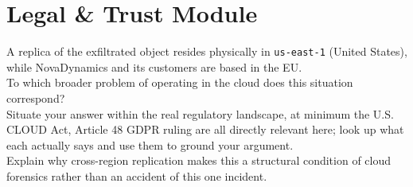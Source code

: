 \section{Legal \& Trust Module}

\begin{questionbox}[title=Question (a)]
A replica of the exfiltrated object resides physically in \texttt{us-east-1} (United States), while NovaDynamics and its customers are based in the EU. \\
To which broader problem of operating in the cloud does this situation correspond? \\
Situate your answer within the real regulatory landscape, at minimum the U.S. CLOUD Act, Article 48 GDPR ruling are all directly relevant here; look up what each actually says and use them to ground your argument. \\
Explain why cross-region replication makes this a structural condition of cloud forensics rather than an accident of this one incident.
\end{questionbox}

\begin{answerbox}
\vspace{4cm}
\end{answerbox}

